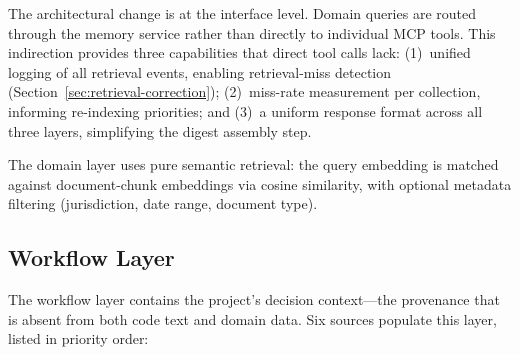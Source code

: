 \documentclass[11pt]{article}
\begin{document}
The architectural change is at the interface level.
Domain queries are routed through the memory service rather than directly to individual MCP tools.
This indirection provides three capabilities that direct tool calls lack: (1)~unified logging of all retrieval events, enabling retrieval-miss detection (Section~\ref{sec:retrieval-correction}); (2)~miss-rate measurement per collection, informing re-indexing priorities; and (3)~a uniform response format across all three layers, simplifying the digest assembly step.

The domain layer uses pure semantic retrieval: the query embedding is matched against document-chunk embeddings via cosine similarity, with optional metadata filtering (jurisdiction, date range, document type).

\subsection{Workflow Layer}
\label{sec:workflow-layer}

The workflow layer contains the project's decision context---the provenance that is absent from both code text and domain data.
Six sources populate this layer, listed in priority order:
\end{document}
